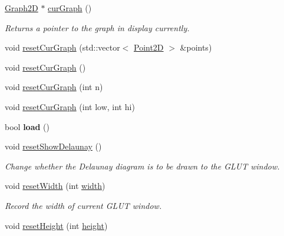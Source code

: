 \begin{DoxyCompactItemize}
\item 
\hyperlink{classcmst_1_1_graph2_d}{Graph2D} $\ast$ \hyperlink{classcmst_1_1_window_a83548b1c4406f37a812a0920fc4d6669}{cur\+Graph} ()\hypertarget{classcmst_1_1_window_a83548b1c4406f37a812a0920fc4d6669}{}\label{classcmst_1_1_window_a83548b1c4406f37a812a0920fc4d6669}

\begin{DoxyCompactList}\small\item\em Returns a pointer to the graph in display currently. \end{DoxyCompactList}\item 
void \hyperlink{classcmst_1_1_window_adfa83ea52f2c09def65b79cdf57092ad}{reset\+Cur\+Graph} (std\+::vector$<$ \hyperlink{classcmst_1_1_point2_d}{Point2D} $>$ \&points)
\item 
void \hyperlink{classcmst_1_1_window_a08365866ac2ffa9793c25c92750341e2}{reset\+Cur\+Graph} ()
\item 
void \hyperlink{classcmst_1_1_window_a83743944c1c6429f0eb9f3c72c9b7f22}{reset\+Cur\+Graph} (int n)
\item 
void \hyperlink{classcmst_1_1_window_aa4ad17303edd88d526b66f9e6918fe7a}{reset\+Cur\+Graph} (int low, int hi)
\item 
bool {\bfseries load} ()\hypertarget{classcmst_1_1_window_a3bb28914f7c58f3df9860ce333a8f25f}{}\label{classcmst_1_1_window_a3bb28914f7c58f3df9860ce333a8f25f}

\item 
void \hyperlink{classcmst_1_1_window_ae54c419d28bd352f52a3beffa6fc1f32}{reset\+Show\+Delaunay} ()\hypertarget{classcmst_1_1_window_ae54c419d28bd352f52a3beffa6fc1f32}{}\label{classcmst_1_1_window_ae54c419d28bd352f52a3beffa6fc1f32}

\begin{DoxyCompactList}\small\item\em Change whether the Delaunay diagram is to be drawn to the G\+L\+UT window. \end{DoxyCompactList}\item 
void \hyperlink{classcmst_1_1_window_a3f234daf3198e3611892515f1721de44}{reset\+Width} (int \hyperlink{classcmst_1_1_window_a5fc4ccbd9afed56cd17d341269028da2}{width})\hypertarget{classcmst_1_1_window_a3f234daf3198e3611892515f1721de44}{}\label{classcmst_1_1_window_a3f234daf3198e3611892515f1721de44}

\begin{DoxyCompactList}\small\item\em Record the width of current G\+L\+UT window. \end{DoxyCompactList}\item 
void \hyperlink{classcmst_1_1_window_a8c4d7788d1932e73397c20b7a9639d69}{reset\+Height} (int \hyperlink{classcmst_1_1_window_a6fc02b2afee52c0f71b6a3bd39c9210f}{height})\hypertarget{classcmst_1_1_window_a8c4d7788d1932e73397c20b7a9639d69}{}\label{classcmst_1_1_window_a8c4d7788d1932e73397c20b7a9639d69}


\end{DoxyCompactItemize}

